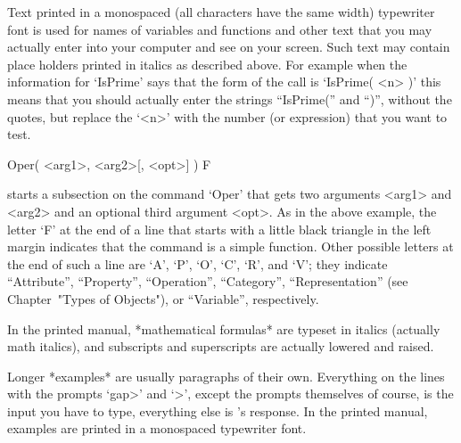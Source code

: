 
Text printed in a monospaced (all characters have the same width)
typewriter font is used for names of variables and functions
and other text that you may actually enter into your computer
and see on your screen.  Such text may contain
place holders printed in italics as described above.  For example
when the information for `IsPrime' says that the form of the call is
`IsPrime( <n> )' this means that you should actually
enter the strings ``IsPrime('' and ``)'', without the quotes,
but replace the `<n>' with the number (or expression)
that you want to test.

\)Oper( <arg1>, <arg2>[, <opt>] ) F

starts a subsection on the command `Oper' that gets two arguments <arg1>
and <arg2> and an optional third argument <opt>.
As in the above example, the letter `F' at the end of a line that starts
with a little black triangle in the left margin indicates that the command
is a simple function.
Other possible letters at the end of such a line are
`A', `P', `O', `C', `R', and `V';
they indicate ``Attribute'', ``Property'', ``Operation'', ``Category'',
``Representation'' (see Chapter~"Types of Objects"), or ``Variable'',
respectively.

In the printed manual, *mathematical formulas* are typeset in italics
(actually math italics), and subscripts and superscripts are actually
lowered and raised.

Longer *examples* are usually paragraphs of their own.
Everything on the lines with the prompts `gap>' and `>', except
the prompts themselves of course, is the input you have to type,
everything else is {\GAP}'s response. In the printed manual,
examples are printed in a monospaced typewriter font.



